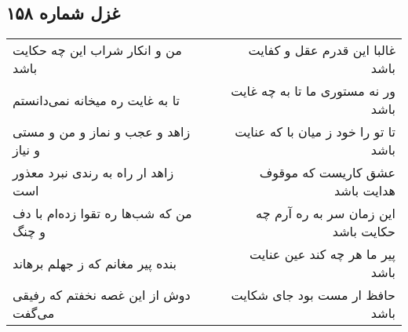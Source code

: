\begin{center}
\section*{غزل شماره ۱۵۸}
\label{sec:sh158}
\begin{longtable}{l p{0.5cm} r}
من و انکار شراب این چه حکایت باشد
&&
غالبا این قدرم عقل و کفایت باشد
\\
تا به غایت ره میخانه نمی‌دانستم
&&
ور نه مستوری ما تا به چه غایت باشد
\\
زاهد و عجب و نماز و من و مستی و نیاز
&&
تا تو را خود ز میان با که عنایت باشد
\\
زاهد ار راه به رندی نبرد معذور است
&&
عشق کاریست که موقوف هدایت باشد
\\
من که شب‌ها ره تقوا زده‌ام با دف و چنگ
&&
این زمان سر به ره آرم چه حکایت باشد
\\
بنده پیر مغانم که ز جهلم برهاند
&&
پیر ما هر چه کند عین عنایت باشد
\\
دوش از این غصه نخفتم که رفیقی می‌گفت
&&
حافظ ار مست بود جای شکایت باشد
\\
\end{longtable}
\end{center}
